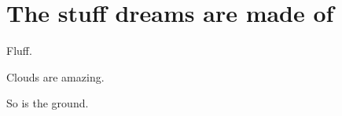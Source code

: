 \mode*
\section{The stuff dreams are made of}
Fluff.

\begin{frame}
Clouds are amazing.
\end{frame}

So is the ground.
